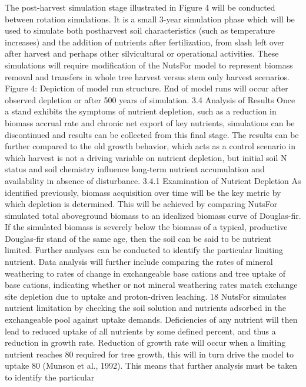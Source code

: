 \documentclass{article}
\begin{document}
The post-harvest simulation stage illustrated in Figure 4 will be conducted between rotation
simulations. It is a small 3-year simulation phase which will be used to simulate both postharvest soil characteristics (such as temperature increases) and the addition of nutrients after
fertilization, from slash left over after harvest and perhaps other silvicultural or operational
activities. These simulations will require modification of the NutsFor model to represent biomass
removal and transfers in whole tree harvest versus stem only harvest scenarios.
Figure 4: Depiction of model run structure. End of model runs will occur after observed
depletion or after 500 years of simulation.
3.4 Analysis of Results
Once a stand exhibits the symptoms of nutrient depletion, such as a reduction in biomass accrual
rate and chronic net export of key nutrients, simulations can be discontinued and results can be
collected from this final stage. The results can be further compared to the old growth behavior,
which acts as a control scenario in which harvest is not a driving variable on nutrient depletion,
but initial soil N status and soil chemistry influence long-term nutrient accumulation and
availability in absence of disturbance.
3.4.1 Examination of Nutrient Depletion
As identified previously, biomass acquisition over time will be the key metric by which
depletion is determined. This will be achieved by comparing NutsFor simulated total
aboveground biomass to an idealized biomass curve of Douglas-fir. If the simulated biomass is
severely below the biomass of a typical, productive Douglas-fir stand of the same age, then the
soil can be said to be nutrient limited. Further analyses can be conducted to identify the
particular limiting nutrient. Data analysis will further include comparing the rates of mineral
weathering to rates of change in exchangeable base cations and tree uptake of base cations,
indicating whether or not mineral weathering rates match exchange site depletion due to uptake
and proton-driven leaching.
18
NutsFor simulates nutrient limitation by checking the soil solution and nutrients adsorbed in the
exchangeable pool against uptake demands. Deficiencies of any nutrient will then lead to
reduced uptake of all nutrients by some defined percent, and thus a reduction in growth rate.
Reduction of growth rate will occur when a limiting nutrient reaches 80%
required for tree growth, this will in turn drive the model to uptake 80%
(Munson et al., 1992). This means that further analysis must be taken to identify the particular
\end{document}
